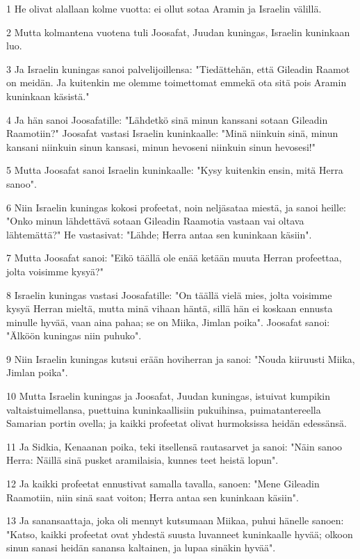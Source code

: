 \par 1 He olivat alallaan kolme vuotta: ei ollut sotaa Aramin ja Israelin välillä.
\par 2 Mutta kolmantena vuotena tuli Joosafat, Juudan kuningas, Israelin kuninkaan luo.
\par 3 Ja Israelin kuningas sanoi palvelijoillensa: "Tiedättehän, että Gileadin Raamot on meidän. Ja kuitenkin me olemme toimettomat emmekä ota sitä pois Aramin kuninkaan käsistä."
\par 4 Ja hän sanoi Joosafatille: "Lähdetkö sinä minun kanssani sotaan Gileadin Raamotiin?" Joosafat vastasi Israelin kuninkaalle: "Minä niinkuin sinä, minun kansani niinkuin sinun kansasi, minun hevoseni niinkuin sinun hevosesi!"
\par 5 Mutta Joosafat sanoi Israelin kuninkaalle: "Kysy kuitenkin ensin, mitä Herra sanoo".
\par 6 Niin Israelin kuningas kokosi profeetat, noin neljäsataa miestä, ja sanoi heille: "Onko minun lähdettävä sotaan Gileadin Raamotia vastaan vai oltava lähtemättä?" He vastasivat: "Lähde; Herra antaa sen kuninkaan käsiin".
\par 7 Mutta Joosafat sanoi: "Eikö täällä ole enää ketään muuta Herran profeettaa, jolta voisimme kysyä?"
\par 8 Israelin kuningas vastasi Joosafatille: "On täällä vielä mies, jolta voisimme kysyä Herran mieltä, mutta minä vihaan häntä, sillä hän ei koskaan ennusta minulle hyvää, vaan aina pahaa; se on Miika, Jimlan poika". Joosafat sanoi: "Älköön kuningas niin puhuko".
\par 9 Niin Israelin kuningas kutsui erään hoviherran ja sanoi: "Nouda kiiruusti Miika, Jimlan poika".
\par 10 Mutta Israelin kuningas ja Joosafat, Juudan kuningas, istuivat kumpikin valtaistuimellansa, puettuina kuninkaallisiin pukuihinsa, puimatantereella Samarian portin ovella; ja kaikki profeetat olivat hurmoksissa heidän edessänsä.
\par 11 Ja Sidkia, Kenaanan poika, teki itsellensä rautasarvet ja sanoi: "Näin sanoo Herra: Näillä sinä pusket aramilaisia, kunnes teet heistä lopun".
\par 12 Ja kaikki profeetat ennustivat samalla tavalla, sanoen: "Mene Gileadin Raamotiin, niin sinä saat voiton; Herra antaa sen kuninkaan käsiin".
\par 13 Ja sanansaattaja, joka oli mennyt kutsumaan Miikaa, puhui hänelle sanoen: "Katso, kaikki profeetat ovat yhdestä suusta luvanneet kuninkaalle hyvää; olkoon sinun sanasi heidän sanansa kaltainen, ja lupaa sinäkin hyvää".
